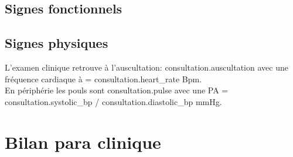 \documentclass[12pt,a4paper]{article}
\begin{document}
                  \subsection{Signes fonctionnels}
                  \begin{itemize}
                    {%
                      {%
                        {%
     {%

\end{itemize}
\subsection{Signes physiques}
 L'examen clinique retrouve à l'auscultation: {{ consultation.auscultation }} avec
 une fréquence cardiaque à = {{ consultation.heart_rate}} Bpm.\\

 En périphérie les pouls sont {{ consultation.pulse }} avec une PA = {{ consultation.systolic_bp }}/{{ consultation.diastolic_bp }}mmHg.\\

\section{Bilan para clinique}
\end{document}
